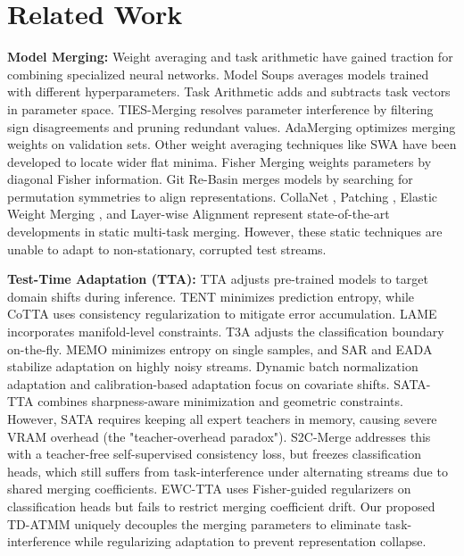 \documentclass{article}
\theoremstyle{plain}
\theoremstyle{definition}
\theoremstyle{remark}
\begin{document}
\section{Related Work}
\label{sec:related}
\textbf{Model Merging:} Weight averaging and task arithmetic have gained traction for combining specialized neural networks. Model Soups \cite{modelsoups2022} averages models trained with different hyperparameters. Task Arithmetic \cite{taskarithmetic2022, taskvectors2023} adds and subtracts task vectors in parameter space. TIES-Merging \cite{tiesmerging2023} resolves parameter interference by filtering sign disagreements and pruning redundant values. AdaMerging \cite{adamerging2023} optimizes merging weights on validation sets. Other weight averaging techniques like SWA \cite{swa2018} have been developed to locate wider flat minima. Fisher Merging \cite{fishermerging2021} weights parameters by diagonal Fisher information. Git Re-Basin \cite{gitrebasin2022} merges models by searching for permutation symmetries to align representations. CollaNet \cite{collanet2023}, Patching \cite{patching2023}, Elastic Weight Merging \cite{elasticweightmerging2023}, and Layer-wise Alignment \cite{multitaskmerging2023} represent state-of-the-art developments in static multi-task merging. However, these static techniques are unable to adapt to non-stationary, corrupted test streams.

\textbf{Test-Time Adaptation (TTA):} TTA adjusts pre-trained models to target domain shifts during inference. TENT \cite{tent2021} minimizes prediction entropy, while CoTTA \cite{cotta2022} uses consistency regularization to mitigate error accumulation. LAME \cite{lame2022} incorporates manifold-level constraints. T3A \cite{t3a2021} adjusts the classification boundary on-the-fly. MEMO \cite{memo2022} minimizes entropy on single samples, and SAR \cite{sar2023} and EADA \cite{eada2022} stabilize adaptation on highly noisy streams. Dynamic batch normalization adaptation \cite{norm2022} and calibration-based adaptation \cite{mummadi2021} focus on covariate shifts. SATA-TTA \cite{sata2026} combines sharpness-aware minimization \cite{sam2021} and geometric constraints. However, SATA requires keeping all expert teachers in memory, causing severe VRAM overhead (the "teacher-overhead paradox"). S2C-Merge \cite{s2cmerge2026} addresses this with a teacher-free self-supervised consistency loss, but freezes classification heads, which still suffers from task-interference under alternating streams due to shared merging coefficients. EWC-TTA \cite{ewctta2026} uses Fisher-guided regularizers on classification heads but fails to restrict merging coefficient drift. Our proposed TD-ATMM uniquely decouples the merging parameters to eliminate task-interference while regularizing adaptation to prevent representation collapse.
\end{document}
